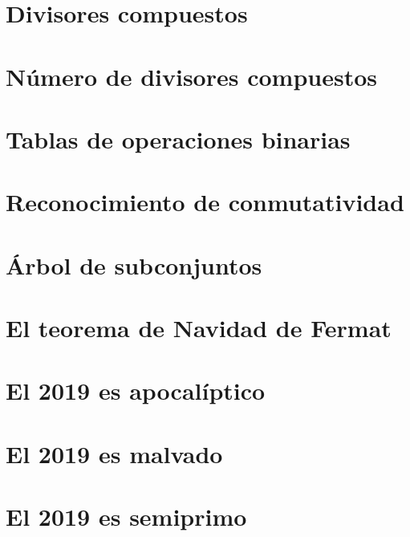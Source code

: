 \documentclass[a4paper,12pt,twoside]{book}
\begin{document}

\chapter{Divisores compuestos}
\label{181224}

\chapter{Número de divisores compuestos}
\label{181225}

\chapter{Tablas de operaciones binarias}
\label{181226}

\chapter{Reconocimiento de conmutatividad}
\label{181227}

\chapter{Árbol de subconjuntos}
\label{181228}


\chapter{El teorema de Navidad de Fermat}
\label{181231}

\chapter{El 2019 es apocalíptico}
\label{190101}

\chapter{El 2019 es malvado}
\label{190102}

\chapter{El 2019 es semiprimo}
\label{190103}
\end{document}
